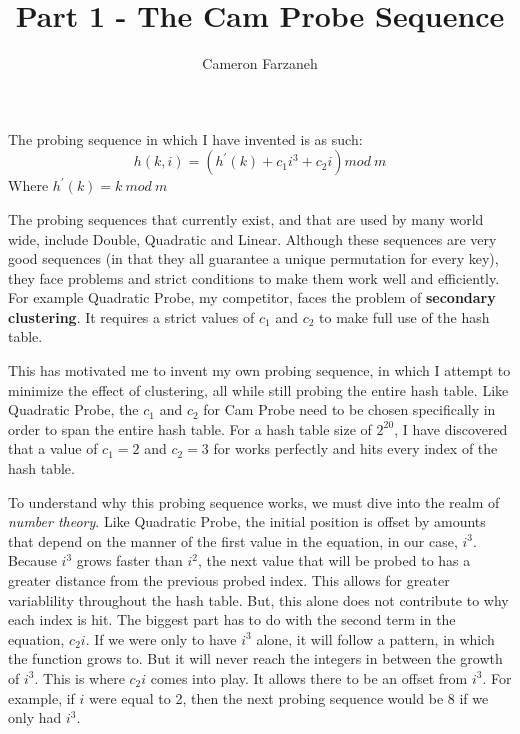 \documentclass{article}
\author{Cameron Farzaneh}
\title{Part 1 - The Cam Probe Sequence\texttrademark {\small{\textregistered \copyright}}}
\begin{document}
	\maketitle
\noindent The probing sequence in which I have invented is as such:
$$h(k, i) =(h^\prime(k) + c_1i^3 + c_2i)mod\:m$$ 
Where $h^\prime(k) = k\:mod\:m$ \newline

The probing sequences that currently exist, and that are used by many world wide, include Double, Quadratic and Linear. Although these sequences are very good sequences (in that they all guarantee  a unique permutation for every key), they face problems and strict conditions to make them work well and efficiently. For example Quadratic Probe, my competitor, faces the problem of \textbf{secondary clustering}. It requires a strict values of $c_1$ and $c_2$ to make full use of the hash table. 

This has motivated me to invent my own probing sequence, in which I attempt to minimize the effect of clustering, all while still probing the entire hash table. Like Quadratic Probe, the $c_1$ and $c_2$ for Cam Probe{\small{\texttrademark}} need to be chosen specifically in order to span the entire hash table. For a hash table size of $2^{20}$, I have discovered that a value of $c_1 = 2$ and $c_2 = 3$ for works perfectly and hits every index of the hash table.

To understand why this probing sequence works, we must dive into the realm of \textit{number theory}. Like Quadratic Probe, the initial position is offset by amounts that depend on the manner of the first value in the equation, in our case, $i^3$. Because $i^3$ grows faster than $i^2$, the next value that will be probed to has a greater distance from the previous probed index. This allows for greater variablility throughout the hash table. But, this alone does not contribute to why each index is hit. The biggest part has to do with the second term in the equation, $c_2i$. If we were only to have $i^3$ alone, it will follow a pattern, in which the function grows to. But it will never reach the integers in between the growth of $i^3$. This is where $c_2i$ comes into play. It allows there to be an offset from $i^3$. For example, if $i$ were equal to 2, then the next probing sequence would be 8 if we only had $i^3$. 
\end{document}
